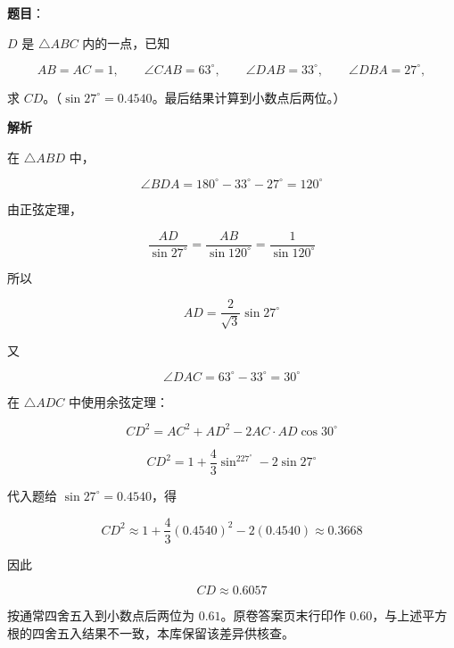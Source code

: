 \begin{answer}

\textbf{题目}：

$D$ 是 $\triangle ABC$ 内的一点，已知

\nopagebreak[4]
\[
AB=AC=1,\qquad \angle CAB=63^\circ,
\qquad \angle DAB=33^\circ,\qquad \angle DBA=27^\circ,
\]

求 $CD$。（$\sin27^\circ=0.4540$。最后结果计算到小数点后两位。）

\textbf{解析}
\nopagebreak[4]
\begin{center}\end{center}
\nopagebreak[4]
在 $\triangle ABD$ 中，

\nopagebreak[4]
\[
\angle BDA=180^\circ-33^\circ-27^\circ=120^\circ
\]

由正弦定理，

\nopagebreak[4]
\[
\frac{AD}{\sin27^\circ}=\frac{AB}{\sin120^\circ}
=\frac1{\sin120^\circ}
\]

所以

\nopagebreak[4]
\[
AD=\frac2{\sqrt3}\sin27^\circ
\]

又

\nopagebreak[4]
\[
\angle DAC=63^\circ-33^\circ=30^\circ
\]

在 $\triangle ADC$ 中使用余弦定理：

\nopagebreak[4]
\[
CD^2=AC^2+AD^2-2AC\cdot AD\cos30^\circ
\]

\nopagebreak[4]
\[
CD^2=1+\frac43\sin^227^\circ-2\sin27^\circ
\]

代入题给 $\sin27^\circ=0.4540$，得

\nopagebreak[4]
\[
CD^2\approx1+\frac43(0.4540)^2-2(0.4540)
\approx0.3668
\]

因此

\nopagebreak[4]
\[
CD\approx0.6057
\]

按通常四舍五入到小数点后两位为 $0.61$。原卷答案页末行印作 $0.60$，与上述平方根的四舍五入结果不一致，本库保留该差异供核查。


\end{answer}
